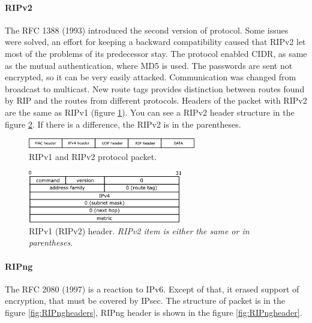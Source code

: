 \documentclass[10pt,a4paper,titlepage]{article}
\begin{document}
            \paragraph{RIPv2}
                The RFC 1388 (1993) introduced the second version of protocol. Some issues were solved, an effort for keeping
                a backward compatibility caused that RIPv2 let most of the problems of its predecessor stay. The protocol
                enabled CIDR, as same as the mutual authentication, where MD5 is used. The passwords are sent not encrypted,
                so it can be very easily attacked. Communication was changed from broadcast to multicast. New route tags
                provides distinction between routes found by RIP and the routes from different protocols. Headers of the packet
                with RIPv2 are the same as RIPv1 (figure \ref{fig:RIPheaders}). You can see a RIPv2 header structure in the figure
                \ref{fig:RIPheader}. If there is a difference, the RIPv2 is in the parentheses. \cite{RFC2453}

                \begin{figure}[h!]
                    \begin{center}
                        \includegraphics[width=0.65\textwidth]{rip_hs.png}
                        \caption{RIPv1 and RIPv2 protocol packet. \label{fig:RIPheaders}}
                    \end{center}
                \end{figure}

                \begin{figure}[h!]
                    \begin{center}
                        \includegraphics[width=0.60\textwidth]{rip_h.png}
                        \caption{RIPv1 (RIPv2) header. {\it RIPv2 item is either the same or in parentheses}. \label{fig:RIPheader}}
                    \end{center}
                \end{figure}

            \paragraph{RIPng}
                The RFC 2080 (1997) is a reaction to IPv6. Except of that, it erased support of encryption, that must be covered
                by IPsec. The structure of packet is in the figure \ref{fig:RIPngheaders}, RIPng header is shown in the figure \ref{fig:RIPngheader}.
                \cite{RFC2080} \cite{RFC2081}
\end{document}
